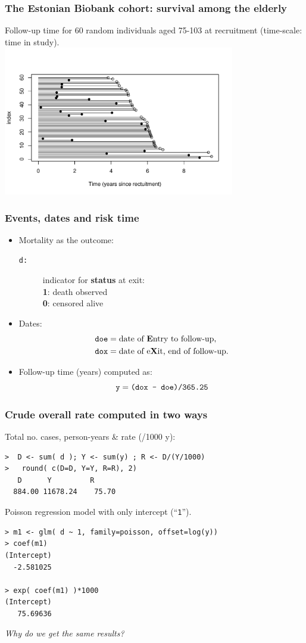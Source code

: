 \documentclass[handout,12pt,dvipsnames,t]{beamer}
\begin{document}
\begin{frame}
\frametitle{The Estonian Biobank cohort: survival among the elderly}
Follow-up time for 60 random individuals aged 75-103 at recruitment (time-scale: time in study). \\[-0.5cm]
\includegraphics[height=6.5cm]{over75fulines}
\end{frame}

\begin{frame}
\frametitle{Events, dates and risk time}
\begin{itemize} %
\item Mortality as the outcome:
\begin{description}
  \item[\tt d:] indicator for {\bf status} at exit: \\
        {\bf 1}: death observed \\
        {\bf 0}: censored alive
\end{description}
\item Dates:
  \begin{align*}
    \texttt{doe} & = \text{date of {\bf E}ntry to follow-up}, \\
    \texttt{dox} & = \text{date of e{\bf X}it, end of follow-up}.
  \end{align*}
\item Follow-up time (years) computed as:
\[
\mathtt{y}= \mbox{\tt (dox - doe)/365.25}
\]
\end{itemize}
\end{frame}


\begin{frame}[fragile]
\frametitle{Crude overall rate computed in two ways}

Total no. cases, person-years \& rate (/1000 y):
\small
\begin{lstlisting}
>  D <- sum( d ); Y <- sum(y) ; R <- D/(Y/1000)
>   round( c(D=D, Y=Y, R=R), 2)
   D      Y         R 
  884.00 11678.24    75.70 
\end{lstlisting}
\normalsize
Poisson regression model with only intercept
(``{\tt 1}'').
\small
\begin{lstlisting}
> m1 <- glm( d ~ 1, family=poisson, offset=log(y))
> coef(m1)
(Intercept) 
  -2.581025 

> exp( coef(m1) )*1000
(Intercept) 
   75.69636 
\end{lstlisting}
\normalsize
\emph{Why do we get the same results?}
\end{frame}
\end{document}

